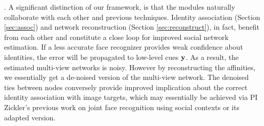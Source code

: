 
\label{sec:closeloop}

. A significant distinction of our framework, is that the modules naturally collaborate with each other and previous techniques. Identity association (Section \ref{sec:assoc}) and network reconstruction (Section \ref{sec:reconstruct}), in fact, benefit from each other and constitute a close loop for improved social network estimation. If a less accurate face recognizer provides weak confidence about identities, the error will be propagated to low-level cues ${\bf y}$. As a result, the estimated multi-view networks is noisy. However by reconstructing the affinities, we essentially get a de-noised version of the multi-view network. The denoised ties between nodes conversely provide improved implication about the correct identity association with image targets, which may essentially be achieved via PI Zickler's previous work on joint face recognition using social contexts \cite{Stone2008,Stone2010} or its adapted version. 
